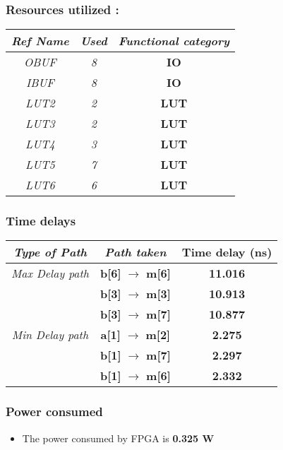 \subsubsection*{Resources utilized : }
\begin{center}
\begin{tabular}{|c|c|c|}\hline
\textit{Ref Name} & \textit{Used} & \textit{Functional category}\\
\hline
\textit{OBUF} & \textit{8} & \textbf{IO}\\
\hline
\textit{IBUF} & \textit{8} & \textbf{IO}\\
\hline
\textit{LUT2} & \textit{2} & \textbf{LUT}\\
\hline
\textit{LUT3} & \textit{2} & \textbf{LUT}\\
\hline
\textit{LUT4} & \textit{3} & \textbf{LUT}\\
\hline
\textit{LUT5} & \textit{7} & \textbf{LUT}\\
\hline
\textit{LUT6} & \textit{6} & \textbf{LUT}\\
\hline
\end{tabular}
\end{center}
\subsubsection*{Time delays}
\begin{center}
\begin{tabular}{|c|c|c|}\hline
\textit{Type of Path} & \textit{Path taken} & \textbf{Time delay (ns)}\\
\hline
\textit{Max Delay path} 
					  & \textbf{b[6]} \(\rightarrow\) \textbf{m[6]} & \textbf{11.016}  \\\cline{2-3}
					  & \textbf{b[3]} \(\rightarrow\) \textbf{m[3]}  & \textbf{10.913} \\\cline{2-3}
					  & \textbf{b[3]} \(\rightarrow\) \textbf{m[7]}  & \textbf{10.877} \\\cline{2-3}
    \hline
\textit{Min Delay path}
					  & \textbf{a[1]} \(\rightarrow\) \textbf{m[2]} & \textbf{2.275}  \\\cline{2-3}
					  & \textbf{b[1]} \(\rightarrow\) \textbf{m[7]}  & \textbf{2.297} \\\cline{2-3}
					  & \textbf{b[1]} \(\rightarrow\) \textbf{m[6]}  & \textbf{2.332} \\\cline{2-3}
    \hline
\end{tabular}
\end{center}
\subsubsection*{Power consumed}
\begin{itemize}
    \item The power consumed by FPGA is \textbf{0.325 W}
\end{itemize}
